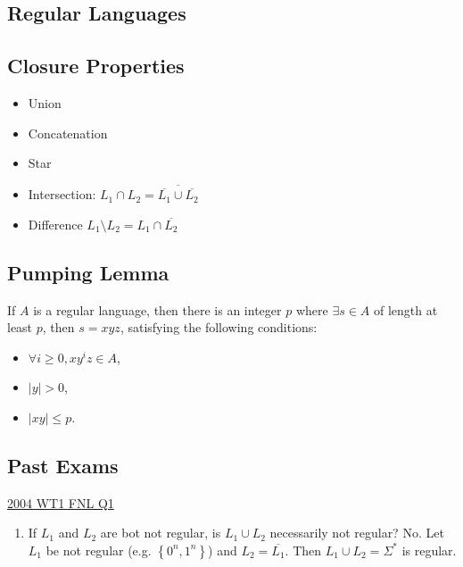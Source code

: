 \documentclass[10pt,landscape,a4paper]{article}
\newcommand{\set}[1]{\left \{ #1 \right \}}
\newcommand{\abs}[1]{\left | #1 \right |}
\begin{document}
\begin{multicols*}{3}

\section{Regular Languages}

\subsection{Closure Properties}

\begin{itemize}
    \item Union
    \item Concatenation
    \item Star
    \item Intersection: $L_1 \cap L_2 = \overline{\overline{L_1} \cup \overline{L_2}}$
    \item Difference $L_1 \setminus L_2 = L_1 \cap \overline{L_2}$
\end{itemize}

\subsection{Pumping Lemma}

If $A$ is a regular language, then there is an integer $p$ where $\exists s \in A$ of length at least $p$, then $s = xyz$, satisfying the following conditions:

\begin{itemize}
    \item $\forall i \geq 0, xy^iz \in A$,
    \item $\abs{y} > 0$,
    \item $\abs{xy} \leq p$.
\end{itemize}

\subsection{Past Exams}

\underline{2004 WT1 FNL Q1}

\begin{enumerate}[label=\emph{\alph*)}]
    \item If $L_1$ and $L_2$ are bot not regular, is $L_1 \cup L_2$ necessarily not regular? No. Let $L_1$ be not regular (e.g. $\set{0^n, 1^n}$) and $L_2 = \overline{L_1}$. Then $L_1 \cup L_2 = \Sigma^*$ is regular.
\end{enumerate}


\end{multicols*}
\end{document}

